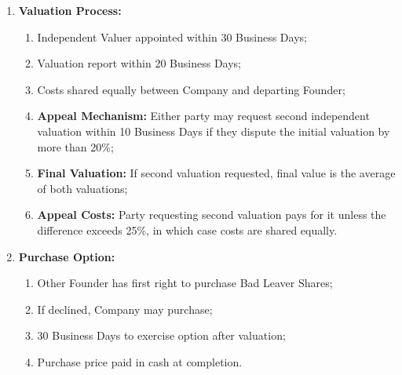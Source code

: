 \begin{enumerate}[label=(\alph*)]
\item \textbf{Valuation Process:}
    \begin{enumerate}[label=(\roman*)]
    \item Independent Valuer appointed within 30 Business Days;
    \item Valuation report within 20 Business Days;
    \item Costs shared equally between Company and departing Founder;
    \item \textbf{Appeal Mechanism:} Either party may request second independent valuation within 10 Business Days if they dispute the initial valuation by more than 20\%;
    \item \textbf{Final Valuation:} If second valuation requested, final value is the average of both valuations;
    \item \textbf{Appeal Costs:} Party requesting second valuation pays for it unless the difference exceeds 25\%, in which case costs are shared equally.
    \end{enumerate}

\item \textbf{Purchase Option:}
    \begin{enumerate}[label=(\roman*)]
    \item Other Founder has first right to purchase Bad Leaver Shares;
    \item If declined, Company may purchase;
    \item 30 Business Days to exercise option after valuation;
    \item Purchase price paid in cash at completion.
    \end{enumerate}
\end{enumerate}

